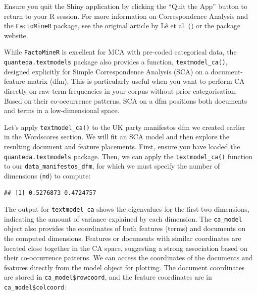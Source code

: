 \documentclass[
]{book}
\newenvironment{Shaded}{\begin{snugshade}}{\end{snugshade}}
\newcommand{\AttributeTok}[1]{\textcolor[rgb]{0.13,0.29,0.53}{#1}}
\newcommand{\CommentTok}[1]{\textcolor[rgb]{0.56,0.35,0.01}{\textit{#1}}}
\newcommand{\DecValTok}[1]{\textcolor[rgb]{0.00,0.00,0.81}{#1}}
\newcommand{\FunctionTok}[1]{\textcolor[rgb]{0.13,0.29,0.53}{\textbf{#1}}}
\newcommand{\NormalTok}[1]{#1}
\newcommand{\OtherTok}[1]{\textcolor[rgb]{0.56,0.35,0.01}{#1}}
\newcommand{\SpecialCharTok}[1]{\textcolor[rgb]{0.81,0.36,0.00}{\textbf{#1}}}
\begin{document}
Ensure you quit the Shiny application by clicking the ``Quit the App'' button to return to your R session. For more information on Correspondence Analysis and the \texttt{FactoMineR} package, see the original article by Lê et al. () or the package website.

While \texttt{FactoMineR} is excellent for MCA with pre-coded categorical data, the \texttt{quanteda.textmodels} package also provides a function, \texttt{textmodel\_ca()}, designed explicitly for Simple Correspondence Analysis (SCA) on a document-feature matrix (dfm). This is particularly useful when you want to perform CA directly on raw term frequencies in your corpus without prior categorisation. Based on their co-occurrence patterns, SCA on a dfm positions both documents and terms in a low-dimensional space.

Let's apply \texttt{textmodel\_ca()} to the UK party manifestos dfm we created earlier in the Wordscores section. We will fit an SCA model and then explore the resulting document and feature placements. First, ensure you have loaded the \texttt{quanteda.textmodels} package. Then, we can apply the \texttt{textmodel\_ca()} function to our \texttt{data\_manifestos\_dfm}, for which we must specify the number of dimensions (\texttt{nd}) to compute:

\begin{Shaded}
\end{Shaded}

\begin{verbatim}
## [1] 0.5276873 0.4724757
\end{verbatim}

The output for \texttt{textmodel\_ca} shows the eigenvalues for the first two dimensions, indicating the amount of variance explained by each dimension. The \texttt{ca\_model} object also provides the coordinates of both features (terms) and documents on the computed dimensions. Features or documents with similar coordinates are located close together in the CA space, suggesting a strong association based on their co-occurrence patterns. We can access the coordinates of the documents and features directly from the model object for plotting. The document coordinates are stored in \texttt{ca\_model\$rowcoord}, and the feature coordinates are in \texttt{ca\_model\$colcoord}:
\end{document}

